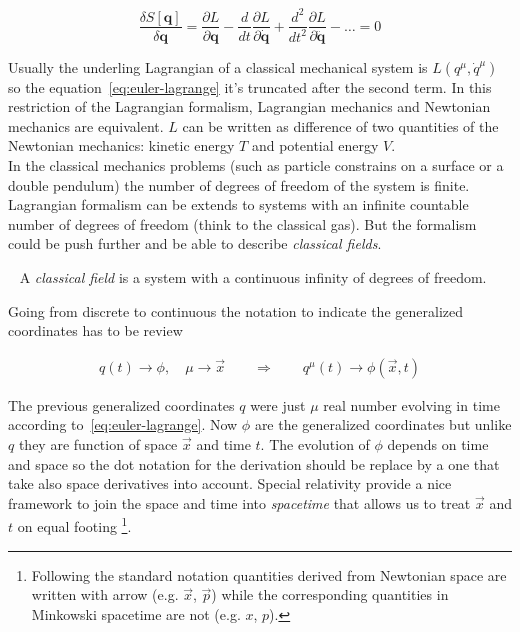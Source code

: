 \begin{equation} \label{eq:euler-lagrange}
  \frac{\delta S[\bm{q}]}{\delta \bm{q}} =
  \frac{\partial L}{\partial \bm{q}} -
  \frac{d}{dt}\frac{\partial L}{\partial \dot{\bm{q}}} +
  \frac{d^2}{dt^2}\frac{\partial L}{\partial \ddot{\bm{q}}} -
  \ldots = 0
\end{equation}

Usually the underling Lagrangian of a classical mechanical system is $L(q^{\mu},
\dot{q}^{\mu})$ so the equation~\eqref{eq:euler-lagrange} it's truncated after
the second term. In this restriction of the Lagrangian formalism, Lagrangian
mechanics and Newtonian mechanics are equivalent. $L$ can be written as
difference of two quantities of the Newtonian mechanics: kinetic energy $T$ and
potential energy $V$. \\

In the classical mechanics problems (such as particle constrains on a surface or
a double pendulum) the number of degrees of freedom of the system is finite.
Lagrangian formalism can be extends to systems with an infinite countable number
of degrees of freedom (think to the classical gas). But the formalism could be
push further and be able to describe \emph{classical fields}.

\begin{definition}\label{def: classical field}~\cite{
  Aldrovandi19_classical_field}
  A \emph{classical field} is a system with a continuous infinity of degrees of
  freedom.
\end{definition}

Going from discrete to continuous the notation to indicate the generalized
coordinates has to be review

\begin{align*}
  q(t) \rightarrow \phi, \quad \mu \rightarrow \vec{x}
  \qquad \Rightarrow \qquad
  q^{\mu}(t) \rightarrow \phi(\vec{x},t)
\end{align*}

The previous generalized coordinates $q$ were just $\mu$ real number evolving in
time according to~\eqref{eq:euler-lagrange}. Now $\phi$ are the generalized
coordinates but unlike $q$ they are function of space $\vec{x}$ and time $t$.
The evolution of $\phi$ depends on time and space so the dot notation for the
derivation should be replace by a one that take also space derivatives
into account. Special relativity provide a nice framework to join the space and
time into \emph{spacetime} that allows us to treat $\vec{x}$ and $t$ on equal
footing
\footnote{
  Following the standard notation quantities derived from Newtonian space are
  written with arrow (e.g. $\vec{x}$, $\vec{p}$) while the corresponding
  quantities in Minkowski spacetime are not (e.g. $x$, $p$).
}.

